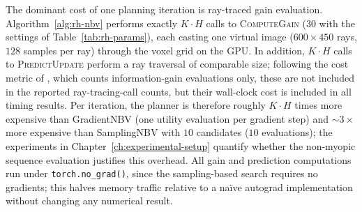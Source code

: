 The dominant cost of one planning iteration is ray-traced gain
evaluation. Algorithm~\ref{alg:rh-nbv} performs exactly $K \cdot H$ calls
to \textsc{ComputeGain} ($30$ with the settings of
Table~\ref{tab:rh-params}), each casting one virtual image
($600 \times 450$ rays, $128$ samples per ray) through the voxel grid on
the GPU. In addition, $K \cdot H$ calls to \textsc{PredictUpdate} perform
a ray traversal of comparable size; following the cost metric of
\textcite{burusa2024}, which counts information-gain evaluations only,
these are not included in the reported ray-tracing-call counts, but their
wall-clock cost is included in all timing results. Per iteration, the
planner is therefore roughly $K \cdot H$ times more expensive than
GradientNBV (one utility evaluation per gradient step) and $\sim\!3\times$
more expensive than SamplingNBV with $10$ candidates ($10$ evaluations);
the experiments in Chapter~\ref{ch:experimental-setup} quantify whether
the non-myopic sequence evaluation justifies this overhead. All gain and
prediction computations run under \texttt{torch.no\_grad()}, since the
sampling-based search requires no gradients; this halves memory traffic
relative to a na\"ive autograd implementation without changing any
numerical result.
